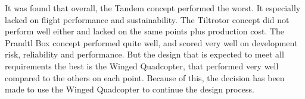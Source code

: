 It was found that overall, the Tandem concept performed the worst. It especially lacked on flight performance and sustainability. The Tiltrotor concept did not perform well either and lacked on the same points plus production cost. The Prandtl Box concept performed quite well, and scored very well on development risk, reliability and performance. But the design that is expected to meet all requirements the best is the Winged Quadcopter, that performed very well compared to the others on each point. Because of this, the decision has been made to use the Winged Quadcopter to continue the design process.



\begin{comment}
- Describe all 5 concepts, refer to where they can be found
- Summarise all criteria
\end{comment}

\begin{comment}
- Explain result and why
- Further elaborate on concept
\end{comment}


















